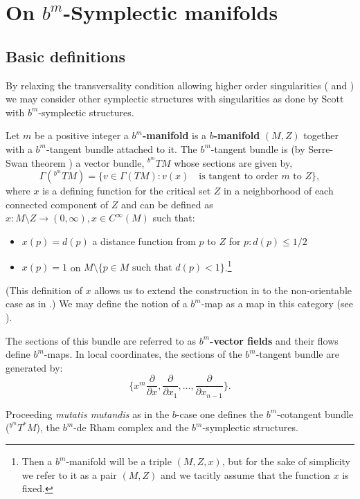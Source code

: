 \section{On $b^m$-Symplectic manifolds}
\subsection{Basic definitions}
By relaxing the transversality condition allowing higher order singularities (\cite{ARNOLD85} and \cite{ARNOLD75}) we may consider other symplectic structures with singularities as done by
Scott \cite{Scott16} with $b^m$-symplectic structures.
{
 Let $m$ be a positive integer a \textbf{$b^m$-manifold} is a \textbf{$b$-manifold} $(M,Z)$ together with
 a $b^m$-tangent bundle attached to it. The $b^m$-tangent bundle is (by Serre-Swan theorem \cite{SWAN}) a vector bundle, $^{b^m} TM $ whose sections are given by, $$\Gamma(^{b^m}TM)=\{v \in \Gamma(TM): v(x) \quad \text{is tangent to order } m \text{ to } Z \},$$
where $x$ is a defining function for the critical set $Z$  in a neighborhood of each connected component of $Z$ and can be defined as
$x:M\setminus Z \rightarrow (0,\infty), x \in C^\infty(M)$ such that:
\begin{itemize}
\item $x(p) = d(p)$ a distance function from $p$ to $Z$ for $p: d(p) \leq 1/2$
\item $x(p) = 1$ on $M\setminus\{p\in M \text{ such that }d(p) < 1\}$.\footnote{{Then a $b^m$-manifold will be a triple $(M, Z, x)$, but for the sake of simplicity we refer to it as a pair $(M,Z)$ and we tacitly assume that the function $x$ is fixed.}}
\end{itemize}
(This definition of $x$ allows us to extend the construction in  \cite{Scott16}  to the non-orientable case as in \cite{MO2}.)
 We may define the notion of a $b^m$-map as a map in this category (see \cite{Scott16}).



 
The sections of this bundle are referred to as \textbf{$b^m$-vector fields} and their flows define $b^m$-maps.
In local coordinates, the sections of the $b^m$-tangent bundle  are generated by:
\begin{equation}\label{eq:generatebmvectors}
\{x^m \frac{\partial}{\partial{x}}, \frac{\partial}{\partial{x_1}},\ldots, \frac{\partial}{\partial{x_{n-1}}}\}.
\end{equation}
\noindent
}



Proceeding \emph{mutatis mutandis} as in the $b$-case one defines  the  $b^m$-cotangent bundle ($^{b^m} T^*M $), the $b^m$-{de} Rham complex and the $b^m$-symplectic structures.




